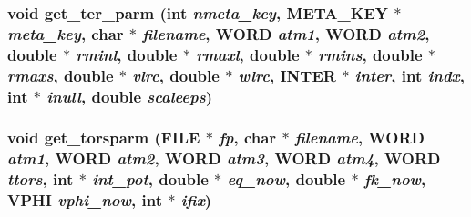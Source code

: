\subsubsection{\setlength{\rightskip}{0pt plus 5cm}void get\_\-ter\_\-parm (int {\em nmeta\_\-key}, {\bf META\_\-KEY} $\ast$ {\em meta\_\-key}, char $\ast$ {\em filename}, {\bf WORD} {\em atm1}, {\bf WORD} {\em atm2}, double $\ast$ {\em rminl}, double $\ast$ {\em rmaxl}, double $\ast$ {\em rmins}, double $\ast$ {\em rmaxs}, double $\ast$ {\em vlrc}, double $\ast$ {\em wlrc}, {\bf INTER} $\ast$ {\em inter}, int {\em indx}, int $\ast$ {\em inull}, double {\em scaleeps})}\label{test_2dzug_2md__getparm_8c_5a3c1f0454ea5320a9677b3261bb2bfa}


\subsubsection{\setlength{\rightskip}{0pt plus 5cm}void get\_\-torsparm (FILE $\ast$ {\em fp}, char $\ast$ {\em filename}, {\bf WORD} {\em atm1}, {\bf WORD} {\em atm2}, {\bf WORD} {\em atm3}, {\bf WORD} {\em atm4}, {\bf WORD} {\em ttors}, int $\ast$ {\em int\_\-pot}, double $\ast$ {\em eq\_\-now}, double $\ast$ {\em fk\_\-now}, {\bf VPHI} {\em vphi\_\-now}, int $\ast$ {\em ifix})}\label{test_2dzug_2md__getparm_8c_7251b806659f7208ad9e2e6547927ef0}


